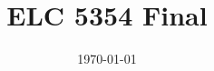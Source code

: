 \documentclass{assignment}
\begin{document}
\title{ELC 5354 Final}

\date{\today}

\maketitle

\newpage

\newpage

\newpage

\newpage

\newpage

\newpage
\end{document}

